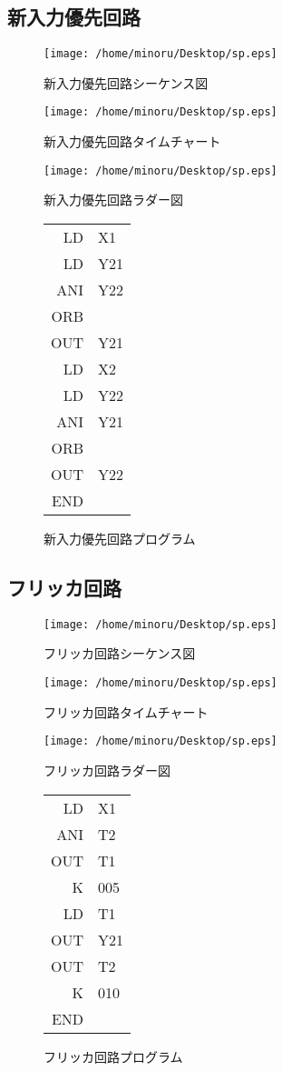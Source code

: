 \documentclass{jsarticle}
\begin{document}
\subsection{新入力優先回路}
\begin{figure}[htbp]
 \centering
 \texttt{[image: /home/minoru/Desktop/sp.eps]}
 \caption{新入力優先回路シーケンス図}
 \texttt{[image: /home/minoru/Desktop/sp.eps]}
 \caption{新入力優先回路タイムチャート}
 \texttt{[image: /home/minoru/Desktop/sp.eps]}
 \caption{新入力優先回路ラダー図}
\end{figure}
\begin{figure}[htbp]
\centering
\begin{tabular}{rl}
LD&X1\\
LD&Y21\\
ANI&Y22\\
ORB&\\
OUT&Y21\\
LD&X2\\
LD&Y22\\
ANI&Y21\\
ORB&\\
OUT&Y22\\
END&\\
\end{tabular}
\caption{新入力優先回路プログラム}
\end{figure}
\newpage
\subsection{フリッカ回路}
\begin{figure}[htbp]
 \centering
 \texttt{[image: /home/minoru/Desktop/sp.eps]}
 \caption{フリッカ回路シーケンス図}
\end{figure}
\begin{figure}[htbp]
 \texttt{[image: /home/minoru/Desktop/sp.eps]}
 \caption{フリッカ回路タイムチャート}
\end{figure}
\begin{figure}[htbp]
 \texttt{[image: /home/minoru/Desktop/sp.eps]}
 \caption{フリッカ回路ラダー図}
\end{figure}
\begin{figure}[htbp]
\centering
\begin{tabular}{rl}
LD&X1\\
ANI&T2\\
OUT&T1\\
K&005\\
LD&T1\\
OUT&Y21\\
OUT&T2\\
K&010\\
END&\\
\end{tabular}
\caption{フリッカ回路プログラム}
\end{figure}
\end{document}
